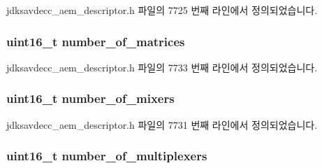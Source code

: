 jdksavdecc\+\_\+aem\+\_\+descriptor.\+h 파일의 7725 번째 라인에서 정의되었습니다.

\subsubsection[{\texorpdfstring{number\+\_\+of\+\_\+matrices}{number_of_matrices}}]{\setlength{\rightskip}{0pt plus 5cm}uint16\+\_\+t number\+\_\+of\+\_\+matrices}\hypertarget{structjdksavdecc__descriptor__audio__unit_a0c19f1b0409a0cdaaf557f4a7a717260}{}\label{structjdksavdecc__descriptor__audio__unit_a0c19f1b0409a0cdaaf557f4a7a717260}


jdksavdecc\+\_\+aem\+\_\+descriptor.\+h 파일의 7733 번째 라인에서 정의되었습니다.

\subsubsection[{\texorpdfstring{number\+\_\+of\+\_\+mixers}{number_of_mixers}}]{\setlength{\rightskip}{0pt plus 5cm}uint16\+\_\+t number\+\_\+of\+\_\+mixers}\hypertarget{structjdksavdecc__descriptor__audio__unit_a6d06803f27b9635d1fb276aa4d4a070b}{}\label{structjdksavdecc__descriptor__audio__unit_a6d06803f27b9635d1fb276aa4d4a070b}


jdksavdecc\+\_\+aem\+\_\+descriptor.\+h 파일의 7731 번째 라인에서 정의되었습니다.

\subsubsection[{\texorpdfstring{number\+\_\+of\+\_\+multiplexers}{number_of_multiplexers}}]{\setlength{\rightskip}{0pt plus 5cm}uint16\+\_\+t number\+\_\+of\+\_\+multiplexers}\hypertarget{structjdksavdecc__descriptor__audio__unit_aa2bffcf80dd2b162cce9a335ef515165}{}\label{structjdksavdecc__descriptor__audio__unit_aa2bffcf80dd2b162cce9a335ef515165}


